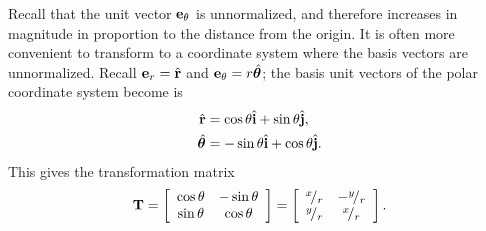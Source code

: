 Recall that the unit vector $\mathbf{e}_\theta$ is unnormalized, and therefore increases in magnitude in proportion to the distance from the origin. It is often more convenient to transform to a coordinate system where the basis vectors are unnormalized. Recall $\mathbf{e}_r = \hat{\mathbf{r}}$ and $\mathbf{e}_\theta = r \hat{\boldsymbol\theta}$; the basis unit vectors of the polar coordinate system become is
\begin{subequations}
\begin{align}
  \hat{\mathbf{r}} &= \cos \theta \hat{\mathbf{i}} + \sin \theta \hat{\mathbf{j}} , \\
  \hat{\boldsymbol\theta} &= -\sin \theta \hat{\mathbf{i}} + \cos \theta \hat{\mathbf{j}}.
\end{align}
\end{subequations}
This gives the transformation matrix
\begin{align}
  \mathbf{T} =
   \left[ \begin{array}{c c}
   \cos \theta &  -\sin \theta \\
   \sin \theta &   \cos \theta \\ \end{array} \right] =
   \left[ \begin{array}{c c}
   {}^{x}\!/_{r} & -{}^{y}\!/_{r} \\
   {}^{y}\!/_{r} &  {}^{x}\!/_{r} \\ \end{array} \right] .
\end{align}



